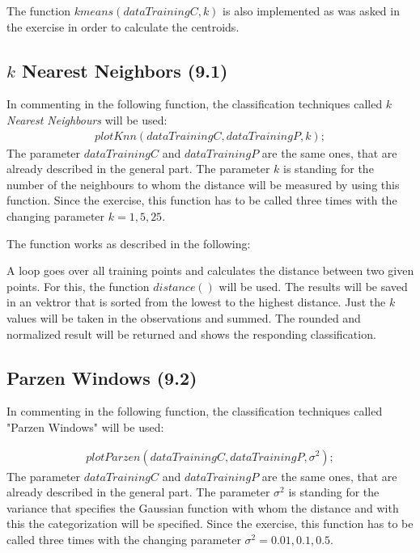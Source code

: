 \documentclass[a4paper,headings=small]{scrartcl}
\begin{document}
The function $kmeans(dataTrainingC,k)$ is also implemented as was asked in the exercise in order to calculate the centroids.


\subsection{$k$ Nearest Neighbors (9.1)}
In commenting in the following function, the classification techniques called \emph{$k$ Nearest Neighbours} will be used:
\begin{align}
plotKnn(dataTrainingC, dataTrainingP, k);
\end{align}
The parameter $dataTrainingC$ and $dataTrainingP$ are the same ones, that are already described in the general part.
The parameter $k$ is standing for the number of the neighbours to whom the distance will be measured by using this function.
Since the exercise, this function has to be called three times with the changing parameter $k = 1, 5, 25$.

The function works as described in the following:

A loop goes over all training points and calculates the distance between two given points.
For this, the function $distance()$ will be used.
The results will be saved in an vektror that is sorted from the lowest to the highest distance.
Just the $k$ values will be taken in the observations and summed.
The rounded and normalized result will be returned and shows the responding classification.

\subsection{Parzen Windows (9.2)}
In commenting in the following function, the classification techniques called "Parzen Windows" will be used:

\begin{align}
plotParzen(dataTrainingC, dataTrainingP, \sigma^2);
\end{align}
The parameter $dataTrainingC$ and $dataTrainingP$ are the same ones,
that are already described in the general part.
The parameter $\sigma^2$ is standing for the variance that specifies the Gaussian function
with whom the distance and with this the categorization will be specified.
Since the exercise, this function has to be called three times with the changing parameter $\sigma^2 = 0.01, 0.1, 0.5$.
\end{document}
